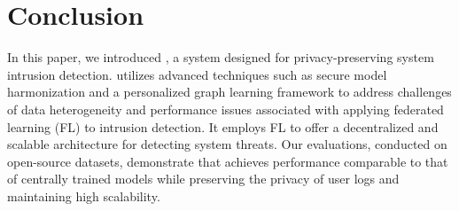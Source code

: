 \section{Conclusion}
\label{sec:conclusion}

In this paper, we introduced \Sys, a system designed for privacy-preserving system intrusion detection. \Sys utilizes advanced techniques such as secure model harmonization and a personalized graph learning framework to address challenges of data heterogeneity and performance issues associated with applying federated learning (FL) to intrusion detection. It employs FL to offer a decentralized and scalable architecture for detecting system threats. Our evaluations, conducted on open-source datasets, demonstrate that \Sys achieves performance comparable to that of centrally trained models while preserving the privacy of user logs and maintaining high scalability.